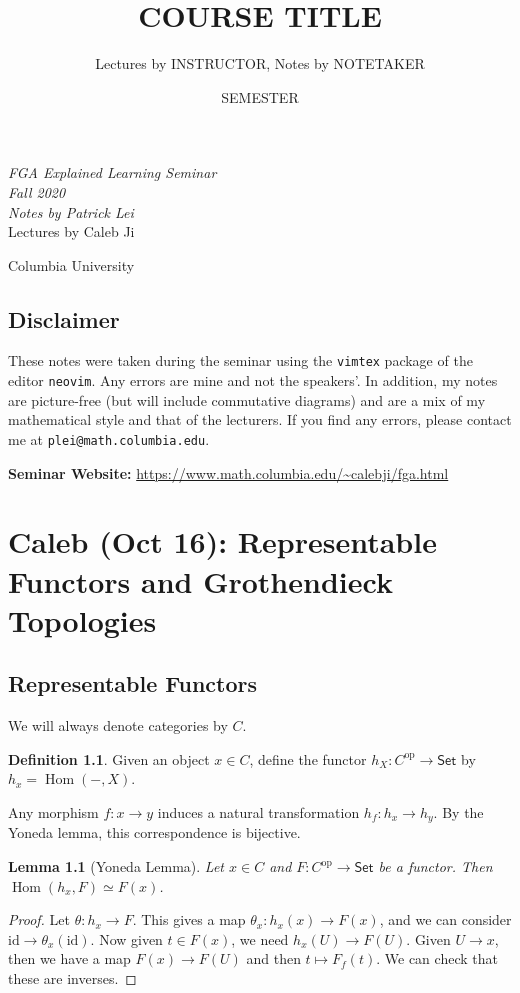 \documentclass[leqno, openany]{memoir}
\title{COURSE TITLE}
\author{Lectures by INSTRUCTOR, Notes by NOTETAKER}
\date{SEMESTER}
\newtheorem{lem}[thm]{Lemma}
\theoremstyle{definition}
\newtheorem{defn}[thm]{Definition}
\theoremstyle{remark}
\theoremstyle{plain}
\theoremstyle{definition}
\theoremstyle{remark}
\newcommand{\mr}[1]{\mathrm{#1}}
\newcommand{\ms}[1]{\mathsf{#1}}
\DeclareMathOperator{\Hom}{Hom}
\newcommand*{\titleSW}
    {\begingroup%
    \raggedleft
    \vspace*{\baselineskip}
    {\Huge\itshape FGA Explained Learning Seminar \\ Fall 2020}\\[\baselineskip]
    {\large\itshape Notes by Patrick Lei}\\[0.2\textheight]
    {\Large Lectures by Caleb Ji}\par
    \vfill
    {\Large \sffamily Columbia University}
    \vspace*{\baselineskip}
\endgroup}
\begin{document}
    
\begin{titlingpage}
\titleSW
\end{titlingpage}

\thispagestyle{empty}
\section*{Disclaimer}%
\label{sec:disclaimer}

These notes were taken during the seminar using the \texttt{vimtex} package of
the editor \texttt{neovim}.  Any errors are mine and not the speakers'.  In
addition, my notes are picture-free (but will include commutative diagrams) and
are a mix of my mathematical style and that of the lecturers.  If you find any
errors, please contact me at \texttt{plei@math.columbia.edu}.

\vspace*{1cm}

\noindent\textbf{Seminar Website:}
\url{https://www.math.columbia.edu/~calebji/fga.html} \newpage


\tableofcontents

\chapter{Caleb (Oct 16): Representable Functors and Grothendieck Topologies}%
\label{cha:caleb_oct_16_representable_functors_and_grothendieck_topologies}

\section{Representable Functors}%

We will always denote categories by $C$.  \begin{defn} Given an object $x \in
C$, define the functor $h_X \colon C^{\mr{op}} \to \ms{Set}$ by $h_x =
\Hom(-,X)$.  \end{defn}

Any morphism $f \colon x \to y$ induces a natural transformation $h_f \colon
h_x \to h_y$. By the Yoneda lemma, this correspondence is bijective.

\begin{lem}[Yoneda Lemma] Let $x \in C$ and $F \colon C^{\mr{op}} \to \ms{Set}$
be a functor. Then $\Hom(h_x,F) \simeq F(x)$.  \end{lem}

\begin{proof} Let $\theta \colon h_x \to F$. This gives a map $\theta_x \colon
    h_x(x) \to F(x)$, and we can consider $\mr{id} \to \theta_x(\mr{id})$. Now
    given $t \in F(x)$, we need $h_x(U) \to F(U)$. Given $U \to x$, then we
    have a map $F(x) \to F(U)$ and then $t \mapsto F_f(t)$. We can check that
    these are inverses.  \end{proof}
\end{document}
